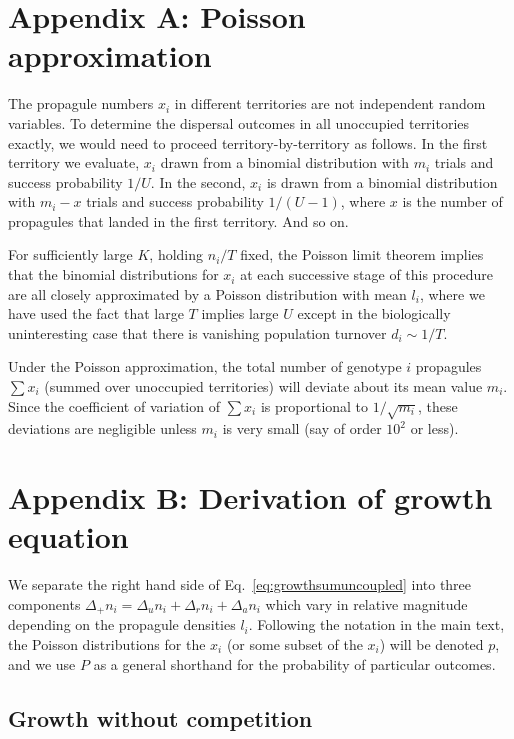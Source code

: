 \documentclass[11pt]{article}
\begin{document}

 

\section*{Appendix A: Poisson approximation}

The propagule numbers $x_i$ in different territories are not independent random variables. To determine the dispersal outcomes in all unoccupied territories exactly, we would need to proceed territory-by-territory as follows. In the first territory we evaluate, $x_i$ drawn from a binomial distribution with $m_i$ trials and success probability $1/U$. In the second, $x_i$ is drawn from a binomial distribution with $m_i-x$ trials and success probability $1/(U-1)$, where $x$ is the number of propagules that landed in the first territory. And so on.

For sufficiently large $K$, holding $n_i/T$ fixed, the Poisson limit theorem implies that the binomial distributions for $x_i$ at each successive stage of this procedure are all closely approximated by a Poisson distribution with mean $l_i$, where we have used the fact that large $T$ implies large $U$ except in the biologically uninteresting case that there is vanishing population turnover $d_i \sim 1/T$. 

Under the Poisson approximation, the total number of genotype $i$ propagules $\sum x_i$ (summed over unoccupied territories) will deviate about its mean value $m_i$. Since the coefficient of variation of $\sum x_i$ is proportional to $1/\sqrt{m_i}$, these deviations are negligible unless $m_i$ is very small (say of order $10^2$ or less).

\section*{Appendix B: Derivation of growth equation}

We separate the right hand side of Eq.~\eqref{eq:growthsumuncoupled} into three components $\Delta_+ n_i = \Delta_u n_i+\Delta_r n_i+\Delta_a n_i$ which vary in relative magnitude depending on the propagule densities $l_i$. Following the notation in the main text, the Poisson distributions for the $x_i$ (or some subset of the $x_i$) will be denoted $p$, and we use $P$ as a general shorthand for the probability of particular outcomes.

\subsection*{Growth without competition}
\end{document}
